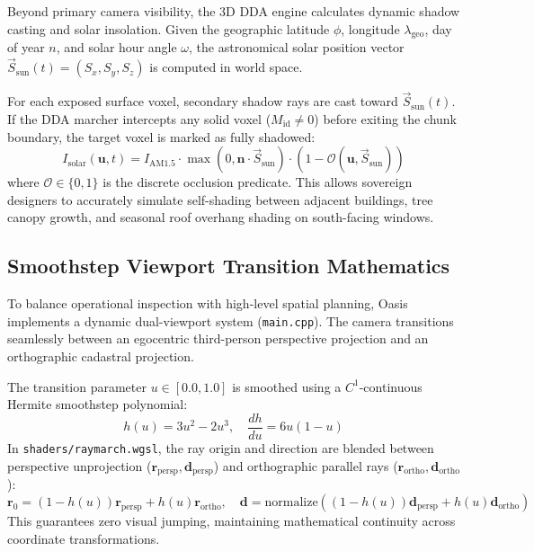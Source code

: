 Beyond primary camera visibility, the 3D DDA engine calculates dynamic shadow casting and solar insolation. Given the geographic latitude $\phi$, longitude $\lambda_{\mathrm{geo}}$, day of year $n$, and solar hour angle $\omega$, the astronomical solar position vector $\vec{S}_{\mathrm{sun}}(t) = (S_x, S_y, S_z)$ is computed in world space.

For each exposed surface voxel, secondary shadow rays are cast toward $\vec{S}_{\mathrm{sun}}(t)$. If the DDA marcher intercepts any solid voxel ($M_{\mathrm{id}} \neq 0$) before exiting the chunk boundary, the target voxel is marked as fully shadowed:
\begin{equation}
I_{\mathrm{solar}}(\mathbf{u}, t) = I_{\mathrm{AM1.5}} \cdot \max(0, \mathbf{n} \cdot \vec{S}_{\mathrm{sun}}) \cdot (1 - \mathcal{O}(\mathbf{u}, \vec{S}_{\mathrm{sun}}))
\label{eq:solar_occlusion}
\end{equation}
where $\mathcal{O} \in \{0, 1\}$ is the discrete occlusion predicate. This allows sovereign designers to accurately simulate self-shading between adjacent buildings, tree canopy growth, and seasonal roof overhang shading on south-facing windows.

\subsection{Smoothstep Viewport Transition Mathematics}

To balance operational inspection with high-level spatial planning, Oasis implements a dynamic dual-viewport system (\texttt{main.cpp}). The camera transitions seamlessly between an egocentric third-person perspective projection and an orthographic cadastral projection.

The transition parameter $u \in [0.0, 1.0]$ is smoothed using a $C^1$-continuous Hermite smoothstep polynomial:
\begin{equation}
h(u) = 3u^2 - 2u^3, \quad \frac{dh}{du} = 6u(1 - u)
\label{eq:hermite_smoothstep}
\end{equation}
In \texttt{shaders/raymarch.wgsl}, the ray origin and direction are blended between perspective unprojection ($\mathbf{r}_{\mathrm{persp}}, \mathbf{d}_{\mathrm{persp}}$) and orthographic parallel rays ($\mathbf{r}_{\mathrm{ortho}}, \mathbf{d}_{\mathrm{ortho}}$):
\begin{equation}
\mathbf{r}_0 = (1 - h(u))\mathbf{r}_{\mathrm{persp}} + h(u)\mathbf{r}_{\mathrm{ortho}}, \quad \mathbf{d} = \mathrm{normalize}\left( (1 - h(u))\mathbf{d}_{\mathrm{persp}} + h(u)\mathbf{d}_{\mathrm{ortho}} \right)
\label{eq:camera_blend}
\end{equation}
This guarantees zero visual jumping, maintaining mathematical continuity across coordinate transformations.

